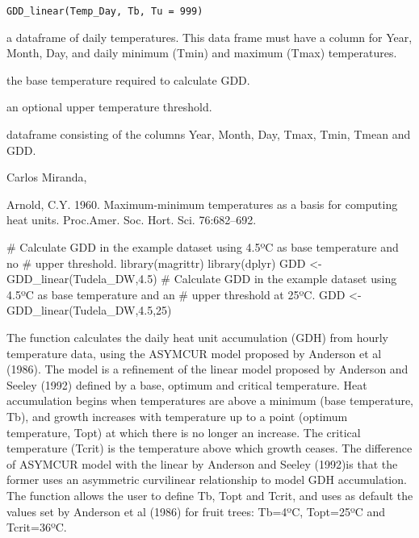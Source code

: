 \documentclass[a4paper]{book}
\begin{document}
%
\begin{Usage}
\begin{verbatim}
GDD_linear(Temp_Day, Tb, Tu = 999)
\end{verbatim}
\end{Usage}
%
\begin{Arguments}
\begin{ldescription}
\item[\code{Temp\_Day}] a dataframe of daily temperatures. This data frame must
have a column for Year, Month, Day, and daily minimum (Tmin) and
maximum (Tmax) temperatures.

\item[\code{Tb}] the base temperature required to calculate GDD.

\item[\code{Tu}] an optional upper temperature threshold.
\end{ldescription}
\end{Arguments}
%
\begin{Value}
dataframe consisting of the columns Year, Month, Day, Tmax, Tmin,
Tmean and GDD.
\end{Value}
%
\begin{Author}\relax
Carlos Miranda, 
\end{Author}
%
\begin{References}\relax
Arnold,  C.Y.  1960.  Maximum-minimum temperatures as a basis for computing
heat units. Proc.Amer. Soc. Hort. Sci. 76:682–692.
\end{References}
%
\begin{Examples}
\begin{ExampleCode}

# Calculate GDD in the example dataset using 4.5ºC as base temperature and no 
# upper threshold.
library(magrittr)
library(dplyr)
GDD <- GDD_linear(Tudela_DW,4.5)
# Calculate GDD in the example dataset using 4.5ºC as base temperature and an 
# upper threshold at 25ºC.
GDD <- GDD_linear(Tudela_DW,4.5,25)


\end{ExampleCode}
\end{Examples}
%
\begin{Description}\relax
The function calculates the daily heat unit accumulation (GDH)
from hourly temperature data, using the ASYMCUR model
proposed by Anderson et al (1986). The model is a refinement
of the linear model proposed by Anderson and Seeley (1992) defined
by a base, optimum and critical temperature. Heat accumulation
begins when temperatures are above a minimum (base temperature,
Tb), and growth increases with temperature up to a
point (optimum temperature, Topt) at which there is no longer
an increase. The critical temperature (Tcrit) is the temperature
above which growth ceases. The difference of ASYMCUR model with 
the linear by Anderson and Seeley (1992)is that the former uses 
an asymmetric curvilinear relationship to model GDH accumulation. 
The function allows the user to define Tb, Topt and Tcrit, and uses
as default the values set by Anderson et al (1986) for fruit trees:
Tb=4ºC, Topt=25ºC and Tcrit=36ºC.
\end{Description}
\end{document}
